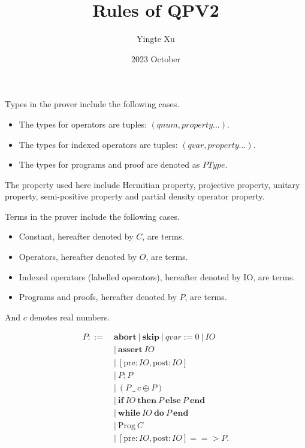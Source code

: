 \documentclass{article}
\title{\textbf{Rules of QPV2}}
\author{Yingte Xu}
\date{2023 October}
\begin{document}
\maketitle

Types in the prover include the following cases.
\begin{itemize}
    \item The types for operators are tuples: $(qnum, property...)$.
    \item The types for indexed operators are tuples: $(qvar, property...)$.
    \item The types for programs and proof are denoted as $PType$.
\end{itemize}
The property used here include Hermitian property, projective property, unitary property, semi-positive property and partial density operator property.

\vspace{1em}

Terms in the prover include the following cases.
\begin{itemize}
    \item Constant, hereafter denoted by $C$, are terms.
    \item Operators, hereafter denoted by $O$, are terms.
    \item Indexed operators (labelled operators), hereafter denoted by IO, are terms.
    \item Programs and proofs, hereafter denoted by $P$, are terms.
\end{itemize}

And $c$ denotes real numbers.


$$
\begin{aligned}
    P ::=\ & \mathbf{abort}\ |\ \mathbf{skip}\ |\ qvar :=0\ |\ IO\ \\
        & |\ \mathbf{assert}\ IO\ \\
        & |\ [\mathrm{pre} : IO, \mathrm{post} : IO] \\
        & |\ P; P \\
        & |\ ( P\ \_\ c \oplus P ) \\
        & |\ \mathbf{if}\ IO\ \mathbf{then}\ P\ \mathbf{else}\ P\ \mathbf{end}\\
        & |\ \mathbf{while}\ IO\ \mathbf{do}\ P\ \mathbf{end}\\
        & |\ \mathrm{Prog}\ C\\
        & |\ [\mathrm{pre} : IO, \mathrm{post} : IO] ==> P.
\end{aligned}
$$
\end{document}
